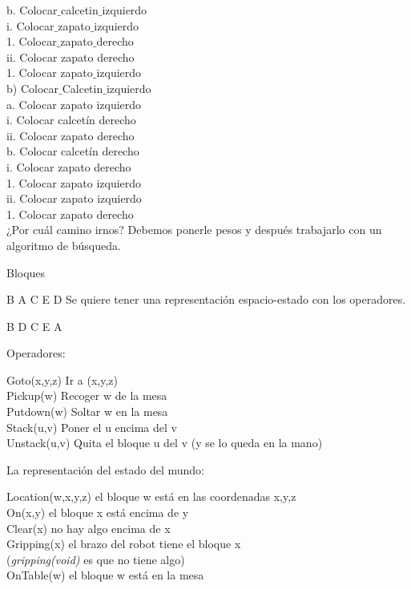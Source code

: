 b. Colocar$\_$calcetin$\_$izquierdo \\
i. Colocar$\_$zapato$\_$izquierdo \\
1. Colocar$\_$zapato$\_$derecho \\
ii. Colocar zapato derecho \\
1. Colocar zapato$\_$izquierdo \\

b) Colocar$\_$Calcetin$\_$izquierdo\\
a. Colocar zapato izquierdo\\
i. Colocar calcetín derecho\\
ii. Colocar zapato derecho\\

b. Colocar calcetín derecho\\
i. Colocar zapato derecho\\
1. Colocar zapato izquierdo\\
ii. Colocar zapato izquierdo\\

1. Colocar zapato derecho\\


¿Por cuál camino irnos?
Debemos ponerle pesos y después trabajarlo con un algoritmo de búsqueda.


\begin{ejemplo}
	Bloques
	
	B	A	C	E	D
	Se quiere tener una representación espacio-estado con los operadores.
	
	B	D	C 	E	A
	
	
\end{ejemplo}

Operadores:


Goto(x,y,z) \hspace{0.5cm} Ir a (x,y,z) \\
Pickup(w) \hspace{0.5cm}Recoger w de la mesa \\
Putdown(w) \hspace{0.5cm}Soltar w en la mesa \\
Stack(u,v) \hspace{0.5cm}Poner el u encima del v \\
Unstack(u,v) \hspace{0.5cm} Quita el bloque u del v (y se lo queda en la mano)


La representación del estado del mundo:


Location(w,x,y,z) \hspace{0.5cm}  el bloque w está en las  coordenadas x,y,z \\
On(x,y) \hspace{0.5cm} el bloque x está encima de y \\
Clear(x) \hspace{0.5cm} no hay algo encima de x \\
Gripping(x) \hspace{0.5cm} el brazo del robot tiene el bloque x \\ (\textit{gripping(void)} es que no tiene algo) \\
OnTable(w) \hspace{0.5cm} el bloque w está en la mesa


